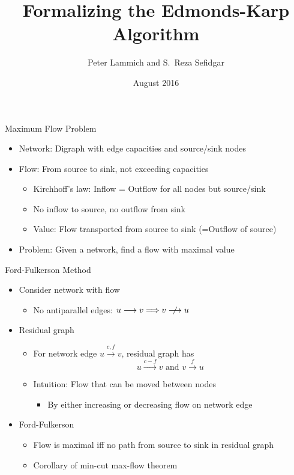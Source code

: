 \documentclass[fleqn]{beamer}
\title{Formalizing the Edmonds-Karp Algorithm}
\author[Peter Lammich]{Peter Lammich and S.~Reza Sefidgar}
\institute[TUM] %
{ TU M\"unchen %
}
\date {August 2016}
\newcommand{\edge}[1]{\stackrel{#1}{\longrightarrow}}
\begin{document}
% 

\begin{frame}
  \titlepage
\end{frame}

\begin{frame}{Maximum Flow Problem}
  \begin{itemize}
   \item Network: Digraph with edge capacities and source/sink nodes
   \item Flow: From source to sink, not exceeding capacities
    \begin{itemize}
     \item Kirchhoff's law: Inflow = Outflow for all nodes but source/sink
     \item No inflow to source, no outflow from sink
     \item Value: Flow transported from source to sink (=Outflow of source)
    \end{itemize}
   \item Problem: Given a network, find a flow with maximal value

  \end{itemize}
\end{frame}
\begin{frame}{Ford-Fulkerson Method}
  \begin{itemize}
   \item Consider network with flow
    \begin{itemize}
     \item No antiparallel edges: $u\edge{} v \implies v\centernot{\edge{}} u$
    \end{itemize}
   \item Residual graph
    \begin{itemize}
     \item For network edge $u\edge{c,f} v$, residual graph has
      \[ u\edge{c-f} v \text{ and } v\edge{f} u \]
     \item Intuition: Flow that can be moved between nodes
      \begin{itemize}
       \item By either increasing or decreasing flow on network edge
      \end{itemize}
    \end{itemize}
   \item Ford-Fulkerson
    \begin{itemize}
     \item Flow is maximal iff no path from source to sink in residual graph
     \item Corollary of min-cut max-flow theorem

    \end{itemize}
  \end{itemize}
\end{frame}
\end{document}
